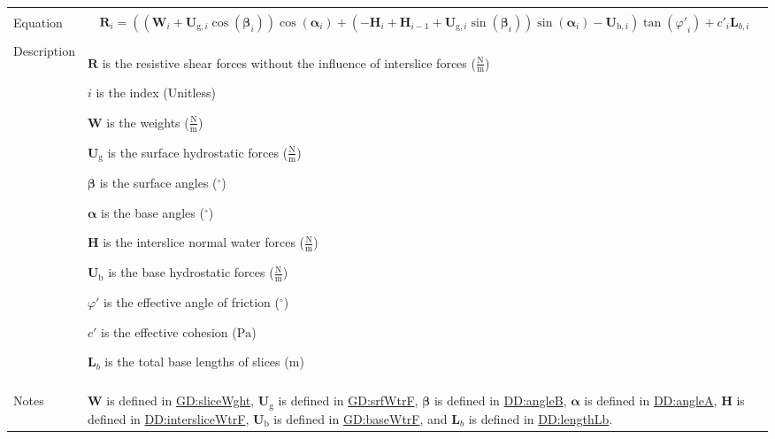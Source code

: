 \documentclass[12pt]{article}
\begin{document}
\begin{minipage}{\textwidth}
\begin{tabular}{>{\raggedright}p{}>{\raggedright\arraybackslash}p{}}
\\ \midrule \\
Equation & \begin{displaymath}
           {\symbf{R}}_{i}=\left(\left({\symbf{W}}_{i}+{\symbf{U}_{\text{g},i}} \cos\left({\symbf{β}}_{i}\right)\right) \cos\left({\symbf{α}}_{i}\right)+\left(-{\symbf{H}}_{i}+{\symbf{H}}_{i-1}+{\symbf{U}_{\text{g},i}} \sin\left({\symbf{β}}_{i}\right)\right) \sin\left({\symbf{α}}_{i}\right)-{\symbf{U}_{\text{b},i}}\right) \tan\left({φ'}_{i}\right)+{c'}_{i} {\symbf{L}_{b,i}}
           \end{displaymath}
\\ \midrule \\
Description & \begin{symbDescription}
              \item{$\symbf{R}$ is the resistive shear forces without the influence of interslice forces ($\frac{\text{N}}{\text{m}}$)}
              \item{$i$ is the index (Unitless)}
              \item{$\symbf{W}$ is the weights ($\frac{\text{N}}{\text{m}}$)}
              \item{${\symbf{U}_{\text{g}}}$ is the surface hydrostatic forces ($\frac{\text{N}}{\text{m}}$)}
              \item{$\symbf{β}$ is the surface angles (${{}^{\circ}}$)}
              \item{$\symbf{α}$ is the base angles (${{}^{\circ}}$)}
              \item{$\symbf{H}$ is the interslice normal water forces ($\frac{\text{N}}{\text{m}}$)}
              \item{${\symbf{U}_{\text{b}}}$ is the base hydrostatic forces ($\frac{\text{N}}{\text{m}}$)}
              \item{$φ'$ is the effective angle of friction (${{}^{\circ}}$)}
              \item{$c'$ is the effective cohesion (${\text{Pa}}$)}
              \item{${\symbf{L}_{b}}$ is the total base lengths of slices (${\text{m}}$)}
              \end{symbDescription}
\\ \midrule \\
Notes & $\symbf{W}$ is defined in \hyperref[GD:sliceWght]{GD:sliceWght}, ${\symbf{U}_{\text{g}}}$ is defined in \hyperref[GD:srfWtrF]{GD:srfWtrF}, $\symbf{β}$ is defined in \hyperref[DD:angleB]{DD:angleB}, $\symbf{α}$ is defined in \hyperref[DD:angleA]{DD:angleA}, $\symbf{H}$ is defined in \hyperref[DD:intersliceWtrF]{DD:intersliceWtrF}, ${\symbf{U}_{\text{b}}}$ is defined in \hyperref[GD:baseWtrF]{GD:baseWtrF}, and ${\symbf{L}_{b}}$ is defined in \hyperref[DD:lengthLb]{DD:lengthLb}.
        

\end{tabular}
\end{minipage}
\end{document}
